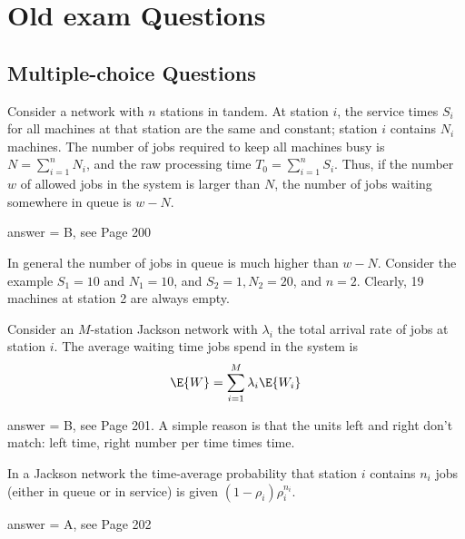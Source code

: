 \section{Old exam Questions}

\subsection{Multiple-choice Questions}
\begin{exercise}[201804] Consider a network with $n$ stations in tandem. At station $i$, the service times $S_i$ for all machines at that station are the same and constant;   station $i$ contains $N_i$ machines. The number of jobs required to keep all machines busy is $N=\sum_{i=1}^n N_i$, and the raw processing time $T_0=\sum_{i=1}^n S_i$. Thus, if the number $w$ of allowed jobs in the system is larger than $N$,  the number of jobs waiting somewhere in queue is $w-N$.
\begin{solution}
answer = B, see Page 200

In general the number of jobs in queue is much higher than $w-N$. Consider the example $S_1=10$ and $N_1=10$, and $S_2=1, N_2=20$, and $n=2$. Clearly, 19 machines at station 2 are always empty.

\end{solution}
\end{exercise}

\begin{exercise}[201804]
Consider an $M$-station Jackson network with $\lambda_i$ the total arrival rate of jobs at station $i$. The average waiting time jobs spend in the system is
\begin{equation*}
  \E{W} = \sum_{i=1}^M \lambda_i \E{W_i}
\end{equation*}
\begin{solution}
answer = B, see Page 201. A simple reason is that the units left and right don't match: left time, right number per time times time. 
\end{solution}
\end{exercise}

\begin{exercise}[201804]
In a Jackson network the time-average probability that station $i$ contains $n_i$ jobs (either in queue or in service) is given $(1-\rho_i)\rho_i^{n_i}$. 
\begin{solution}
answer = A, see Page 202
\end{solution}
\end{exercise}

